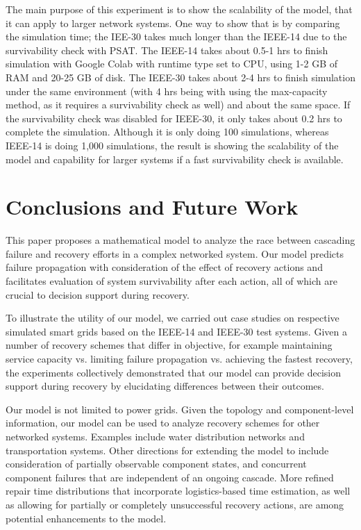 \documentclass[conference]{IEEEtran}
\begin{document}
The main purpose of this experiment is to show the scalability of the model, that it can apply to larger network systems. One way to show that is by comparing the simulation time; the IEE-30 takes much longer than the IEEE-14 due to the survivability check with PSAT. The IEEE-14 takes about 0.5-1 hrs to finish simulation with Google Colab with runtime type set to CPU, using 1-2 GB of RAM and 20-25 GB of disk.
The IEEE-30 takes about 2-4 hrs to finish simulation under the same environment (with 4 hrs being with using the max-capacity method, as it requires a survivability check as well) and about the same space. If the survivability check was disabled for IEEE-30, it only takes about 0.2 hrs to complete the simulation. Although it is only doing 100 simulations, whereas IEEE-14 is doing 1,000 simulations, the result is showing the scalability of the model and capability for larger systems if a fast survivability check is available.  

\section{Conclusions and Future Work}

This paper proposes a mathematical model to analyze the race between cascading failure and recovery efforts in a complex networked system. Our model predicts failure propagation with consideration of the effect of recovery actions and facilitates evaluation of system survivability after each action, all of which are crucial to decision support during recovery.

To illustrate the utility of our model, we carried out case studies on respective simulated smart grids based on the IEEE-14 and IEEE-30 test systems. Given a number of recovery schemes that differ in objective, for example maintaining service capacity vs. limiting failure propagation vs. achieving the fastest recovery, the experiments collectively demonstrated that our model can provide decision support during recovery by elucidating differences between their outcomes.

Our model is not limited to power grids. Given the topology and component-level information, our model can be used to analyze recovery schemes for other networked systems. Examples include water distribution networks and transportation systems. Other directions for extending the model to include consideration of partially observable component states, and concurrent component failures that are independent of an ongoing cascade. More refined repair time distributions that incorporate logistics-based time estimation, as well as allowing for partially or completely unsuccessful recovery actions, are among potential enhancements to the model.




\end{document}
